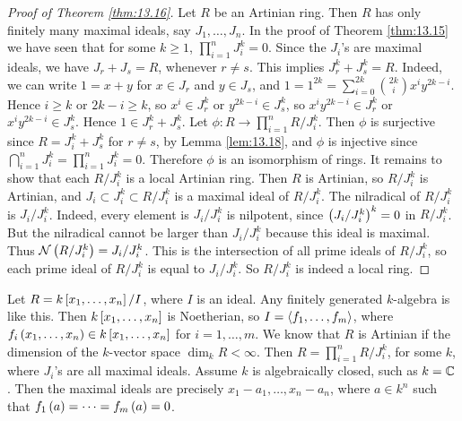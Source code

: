 \begin{proof}[Proof of Theorem \ref{thm:13.16}]
Let $ R $ be an Artinian ring. Then $ R $ has only finitely many maximal ideals, say $ J_1, \dots, J_n $. In the proof of Theorem \ref{thm:13.15} we have seen that for some $ k \ge 1 $, $ \prod_{i = 1}^n J_i^k = 0 $. Since the $ J_i $'s are maximal ideals, we have $ J_r + J_s = R $, whenever $ r \ne s $. This implies $ J_r^k + J_s^k = R $. Indeed, we can write $ 1 = x + y $ for $ x \in J_r $ and $ y \in J_s $, and $ 1 = 1^{2k} = \sum_{i = 0}^{2k} \binom{2k}{i}x^iy^{2k - i} $. Hence $ i \ge k $ or $ 2k - i \ge k $, so $ x^i \in J_r^k $ or $ y^{2k - i} \in J_s^k $, so $ x^iy^{2k - i} \in J_r^k $ or $ x^iy^{2k - i} \in J_s^k $. Hence $ 1 \in J_r^k + J_s^k $. Let $ \phi : R \to \prod_{i = 1}^n R / J_i^k $. Then $ \phi $ is surjective since $ R = J_i^k + J_s^k $ for $ r \ne s $, by Lemma \ref{lem:13.18}, and $ \phi $ is injective since $ \bigcap_{i = 1}^n J_i^k = \prod_{i = 1}^n J_i^k = 0 $. Therefore $ \phi $ is an isomorphism of rings. It remains to show that each $ R / J_i^k $ is a local Artinian ring. Then $ R $ is Artinian, so $ R / J_i^k $ is Artinian, and $ J_i \subset J_i^k \subset R / J_i^k $ is a maximal ideal of $ R / J_i^k $. The nilradical of $ R / J_i^k $ is $ J_i / J_i^k $. Indeed, every element is $ J_i / J_i^k $ is nilpotent, since $ \br{J_i / J_i^k}^k = 0 $ in $ R / J_i^k $. But the nilradical cannot be larger than $ J_i / J_i^k $ because this ideal is maximal. Thus $ \NNN\br{R / J_i^k} = J_i / J_i^k $. This is the intersection of all prime ideals of $ R / J_i^k $, so each prime ideal of $ R / J_i^k $ is equal to $ J_i / J_i^k $. So $ R / J_i^k $ is indeed a local ring.
\end{proof}

\begin{example*}
Let $ R = k\sbr{x_1, \dots, x_n} / I $, where $ I $ is an ideal. Any finitely generated $ k $-algebra is like this. Then $ k\sbr{x_1, \dots, x_n} $ is Noetherian, so $ I = \left\langle f_1, \dots, f_m \right\rangle $, where $ f_i\br{x_1, \dots, x_n} \in k\sbr{x_1, \dots, x_n} $ for $ i = 1, \dots, m $. We know that $ R $ is Artinian if the dimension of the $ k $-vector space $ \dim_k R < \infty $. Then $ R = \prod_{i = 1}^n R / J_i^k $, for some $ k $, where $ J_i $'s are all maximal ideals. Assume $ k $ is algebraically closed, such as $ k = \mathbb{C} $. Then the maximal ideals are precisely $ x_1 - a_1, \dots, x_n - a_n $, where $ a \in k^n $ such that $ f_1\br{a} = \dots = f_m\br{a} = 0 $.
\end{example*}

